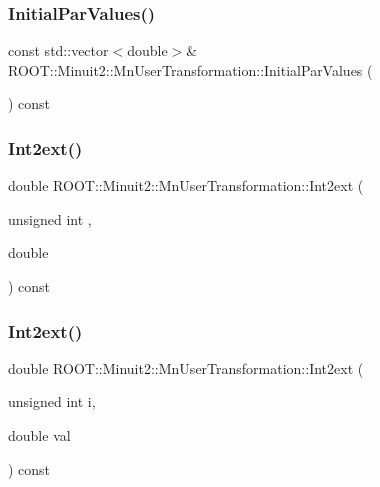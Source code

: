 \subsubsection{\texorpdfstring{InitialParValues()}{InitialParValues()}\hspace{0.1cm}{\footnotesize\ttfamily [2/2]}}
{\footnotesize\ttfamily const std\+::vector$<$double$>$\& R\+O\+O\+T\+::\+Minuit2\+::\+Mn\+User\+Transformation\+::\+Initial\+Par\+Values (\begin{DoxyParamCaption}{ }\end{DoxyParamCaption}) const\hspace{0.3cm}{\ttfamily [inline]}}

\mbox{\label{classROOT_1_1Minuit2_1_1MnUserTransformation_aa05e327d2e4376c0e1db865ba92becdd}} 
\subsubsection{\texorpdfstring{Int2ext()}{Int2ext()}\hspace{0.1cm}{\footnotesize\ttfamily [1/2]}}
{\footnotesize\ttfamily double R\+O\+O\+T\+::\+Minuit2\+::\+Mn\+User\+Transformation\+::\+Int2ext (\begin{DoxyParamCaption}\item[{unsigned int}]{,  }\item[{double}]{ }\end{DoxyParamCaption}) const}

\mbox{\label{classROOT_1_1Minuit2_1_1MnUserTransformation_aa05e327d2e4376c0e1db865ba92becdd}} 
\subsubsection{\texorpdfstring{Int2ext()}{Int2ext()}\hspace{0.1cm}{\footnotesize\ttfamily [2/2]}}
{\footnotesize\ttfamily double R\+O\+O\+T\+::\+Minuit2\+::\+Mn\+User\+Transformation\+::\+Int2ext (\begin{DoxyParamCaption}\item[{unsigned int}]{i,  }\item[{double}]{val }\end{DoxyParamCaption}) const}

